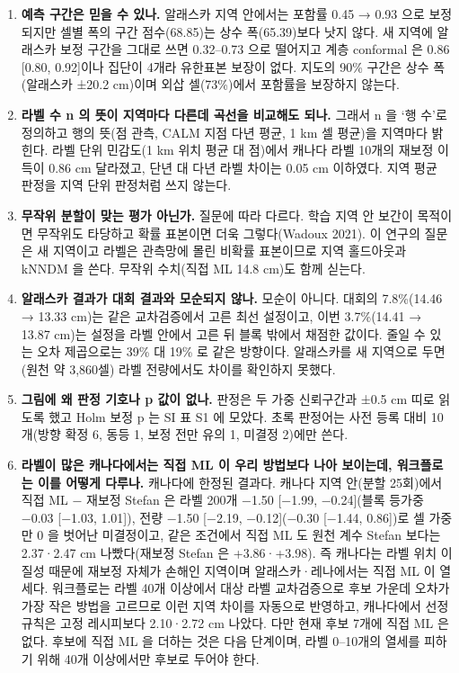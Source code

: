 \begin{enumerate}[leftmargin=1.8em, itemsep=0.45em, label=\textbf{Q\arabic*.}]
  \item \textbf{예측 구간은 믿을 수 있나.} 알래스카 지역 안에서는 포함률 0.45 → 0.93 으로 보정되지만 셀별 폭의 구간 점수(68.85)는 상수 폭(65.39)보다 낫지 않다. 새 지역에 알래스카 보정 구간을 그대로 쓰면 0.32–0.73 으로 떨어지고 계층 conformal 은 0.86 [0.80, 0.92]이나 집단이 4개라 유한표본 보장이 없다. 지도의 90\% 구간은 상수 폭(알래스카 ±20.2 cm)이며 외삽 셀(73\%)에서 포함률을 보장하지 않는다.
  \item \textbf{라벨 수 n 의 뜻이 지역마다 다른데 곡선을 비교해도 되나.} 그래서 n 을 ‘행 수’로 정의하고 행의 뜻(점 관측, CALM 지점 다년 평균, 1 km 셀 평균)을 지역마다 밝힌다. 라벨 단위 민감도(1 km 위치 평균 대 점)에서 캐나다 라벨 10개의 재보정 이득이 0.86 cm 달라졌고, 단년 대 다년 라벨 차이는 0.05 cm 이하였다. 지역 평균 판정을 지역 단위 판정처럼 쓰지 않는다.
  \item \textbf{무작위 분할이 맞는 평가 아닌가.} 질문에 따라 다르다. 학습 지역 안 보간이 목적이면 무작위도 타당하고 확률 표본이면 더욱 그렇다(Wadoux 2021). 이 연구의 질문은 새 지역이고 라벨은 관측망에 몰린 비확률 표본이므로 지역 홀드아웃과 kNNDM 을 쓴다. 무작위 수치(직접 ML 14.8 cm)도 함께 싣는다.
  \item \textbf{알래스카 결과가 대회 결과와 모순되지 않나.} 모순이 아니다. 대회의 7.8\%(14.46 → 13.33 cm)는 같은 교차검증에서 고른 최선 설정이고, 이번 3.7\%(14.41 → 13.87 cm)는 설정을 라벨 안에서 고른 뒤 블록 밖에서 채점한 값이다. 줄일 수 있는 오차 제곱으로는 39\% 대 19\% 로 같은 방향이다. 알래스카를 새 지역으로 두면(원천 약 3,860셀) 라벨 전량에서도 차이를 확인하지 못했다.
  \item \textbf{그림에 왜 판정 기호나 p 값이 없나.} 판정은 두 가중 신뢰구간과 ±0.5 cm 띠로 읽도록 했고 Holm 보정 p 는 SI 표 S1 에 모았다. 초록 판정어는 사전 등록 대비 10개(방향 확정 6, 동등 1, 보정 전만 유의 1, 미결정 2)에만 쓴다.
  \item \textbf{라벨이 많은 캐나다에서는 직접 ML 이 우리 방법보다 나아 보이는데, 워크플로는 이를 어떻게 다루나.} 캐나다에 한정된 결과다. 캐나다 지역 안(분할 25회)에서 직접 ML − 재보정 Stefan 은 라벨 200개 −1.50 [−1.99, −0.24](블록 등가중 −0.03 [−1.03, 1.01]), 전량 −1.50 [−2.19, −0.12](−0.30 [−1.44, 0.86])로 셀 가중만 0 을 벗어난 미결정이고, 같은 조건에서 직접 ML 도 원천 계수 Stefan 보다는 2.37·2.47 cm 나빴다(재보정 Stefan 은 +3.86·+3.98). 즉 캐나다는 라벨 위치 이질성 때문에 재보정 자체가 손해인 지역이며 알래스카·레나에서는 직접 ML 이 열세다. 워크플로는 라벨 40개 이상에서 대상 라벨 교차검증으로 후보 가운데 오차가 가장 작은 방법을 고르므로 이런 지역 차이를 자동으로 반영하고, 캐나다에서 선정 규칙은 고정 레시피보다 2.10·2.72 cm 나았다. 다만 현재 후보 7개에 직접 ML 은 없다. 후보에 직접 ML 을 더하는 것은 다음 단계이며, 라벨 0–10개의 열세를 피하기 위해 40개 이상에서만 후보로 두어야 한다.

\end{enumerate}
